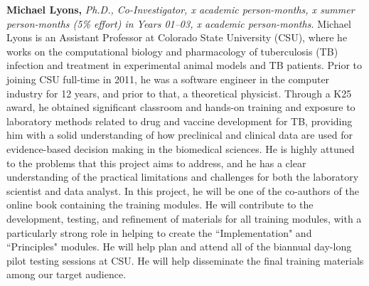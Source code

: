 \documentclass[pdftex,english,11pt,parskip=half]{scrartcl}
\begin{document}
\noindent \textbf{Michael Lyons,} \textit{Ph.D., Co-Investigator, x academic person-months, x summer person-months (5\% effort) in Years 01--03, x academic person-months.} Michael Lyons is an Assistant Professor at Colorado State University (CSU), where he works on the computational biology and pharmacology of tuberculosis (TB) infection and treatment in experimental animal models and TB patients. Prior to joining CSU full-time in 2011, he was a software engineer in the computer industry for 12 years, and prior to that, a theoretical physicist. Through a K25 award, he obtained significant classroom and hands-on training and exposure to laboratory methods related to drug and vaccine development for TB, providing him with a solid understanding of how preclinical and clinical data are used for evidence-based decision making in the biomedical sciences. He is highly attuned to the problems that this project aims to address, and he has a clear understanding of the practical limitations and challenges for both the laboratory scientist and data analyst. In this project, he will be one of the co-authors of the online book containing the training modules. He will contribute to the development, testing, and refinement of materials for all training modules, with a particularly strong role in helping to create the ``Implementation" and ``Principles" modules. He will help plan and attend all of the biannual day-long pilot testing sessions at CSU. He will help disseminate the final training materials among our target audience. 
\end{document}
